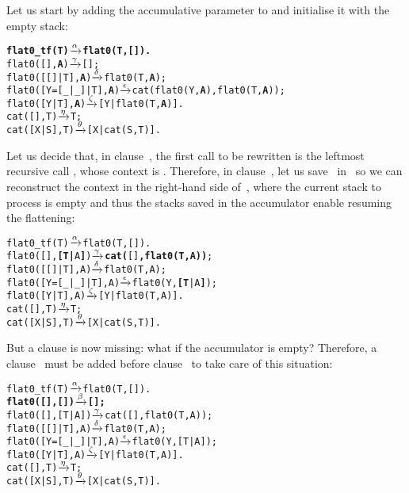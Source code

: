 Let us start by adding the accumulative parameter to 
and initialise it with the empty stack:
\begin{alltt}
\textbf{flat0\_tf(T)          \(\smashedrightarrow{\alpha}\) flat0(T,[]).}\hfill% \emph{Added}
flat0(         [],\textbf{A}) \(\smashedrightarrow{\gamma}\) [];\hfill% A \emph{unused yet}
flat0(     [[]|T],\textbf{A}) \(\smashedrightarrow{\delta}\) flat0(T,\textbf{A});
flat0([Y=[\_|\_]|T],\textbf{A}) \(\smashedrightarrow{\epsilon}\) cat(flat0(Y,\textbf{A}),flat0(T,\textbf{A}));
flat0(      [Y|T],\textbf{A}) \(\smashedrightarrow{\zeta}\) [Y|flat0(T,\textbf{A})].
cat(   [],T)         \(\smashedrightarrow{\eta}\) T;
cat([X|S],T)         \(\smashedrightarrow{\theta}\) [X|cat(S,T)].
\end{alltt}
Let us decide that, in clause~\clause{\epsilon}, the first call to be
rewritten is the leftmost recursive call , whose
context is . Therefore, in
clause~\clause{\epsilon}, let us save~ in~ so we
can reconstruct the context in the right\hyp{}hand side
of~\clause{\gamma}, where the current stack to process is empty and
thus the stacks saved in the accumulator enable resuming the
flattening:
\begin{alltt}
flat0\_tf(T)              \(\smashedrightarrow{\alpha}\) flat0(T,[]).
flat0(         [],\textbf{[T|}A\textbf{]}) \(\smashedrightarrow{\gamma}\) \textbf{cat(}[]\textbf{,flat0(T,A))};\hfill% \emph{Used}
flat0(     [[]|T],    A) \(\smashedrightarrow{\delta}\) flat0(T,A);
flat0([Y=[\_|\_]|T],    A) \(\smashedrightarrow{\epsilon}\) flat0(Y,\textbf{[T}|A\textbf{]});\hfill% \emph{Saved}
flat0(      [Y|T],    A) \(\smashedrightarrow{\zeta}\) [Y|flat0(T,A)].
cat(   [],T)             \(\smashedrightarrow{\eta}\) T;
cat([X|S],T)             \(\smashedrightarrow{\theta}\) [X|cat(S,T)].
\end{alltt}
But a clause is now missing: what if the accumulator is empty?
Therefore, a clause~\clause{\beta} must be added before
clause~\clause{\gamma} to take care of this situation:
\begin{alltt}
flat0\_tf(T)              \(\smashedrightarrow{\alpha}\) flat0(T,[]).
\textbf{flat0(         [],   []) \(\smashedrightarrow{\beta}\) [];}
flat0(         [],[T|A]) \(\smashedrightarrow{\gamma}\) cat([],flat0(T,A));
flat0(     [[]|T],    A) \(\smashedrightarrow{\delta}\) flat0(T,A);
flat0([Y=[\_|\_]|T],    A) \(\smashedrightarrow{\epsilon}\) flat0(Y,[T|A]);
flat0(      [Y|T],    A) \(\smashedrightarrow{\zeta}\) [Y|flat0(T,A)].
cat(   [],T)             \(\smashedrightarrow{\eta}\) T;
cat([X|S],T)             \(\smashedrightarrow{\theta}\) [X|cat(S,T)].
\end{alltt}

